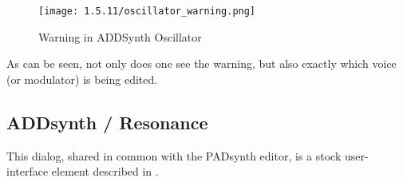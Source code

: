 \begin{figure}[H]
   \centering
   \texttt{[image: 1.5.11/oscillator\_warning.png]}
   \caption{Warning in ADDSynth Oscillator}
   \label{fig:voice_oscillator_warning}
\end{figure}

   As can be seen, not only does one see the warning, but also exactly which
   voice (or modulator) is being edited.

\subsection{ADDsynth / Resonance}
\label{subsec:addsynth_resonance}

   This dialog, shared in common with the PADsynth editor, is a stock
   user-interface element described in
   .

